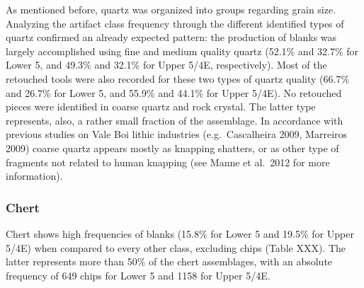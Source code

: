 \documentclass[12pt,twoside]{reedthesis}
\begin{document}
As mentioned before, quartz was organized into groups regarding grain size. Analyzing the artifact class frequency through the different identified types of quartz confirmed an already expected pattern: the production of blanks was largely accomplished using fine and medium quality quartz (52.1\% and 32.7\% for Lower 5, and 49.3\% and 32.1\% for Upper 5/4E, respectively). Most of the retouched tools were also recorded for these two types of quartz quality (66.7\% and 26.7\% for Lower 5, and 55.9\% and 44.1\% for Upper 5/4E). No retouched pieces were identified in coarse quartz and rock crystal. The latter type represents, also, a rather small fraction of the assemblage. In accordance with previous studies on Vale Boi lithic industries (e.g.~Cascalheira 2009, Marreiros 2009) coarse quartz appears mostly as knapping shatters, or as other type of fragments not related to human knapping (see Manne et al.~2012 for more information).
\begin{table}[!h]

\caption{\label{tab:quartzquality2}Vale Boi - Upper 5/4E. Frequencies of technological classes by quartz quality.}
\centering
{}
\end{table}
\hypertarget{chert}{%
\subsubsection{Chert}\label{chert}}

Chert shows high frequencies of blanks (15.8\% for Lower 5 and 19.5\% for Upper 5/4E) when compared to every other class, excluding chips (Table XXX). The latter represents more than 50\% of the chert assemblages, with an absolute frequency of 649 chips for Lower 5 and 1158 for Upper 5/4E.
\end{document}
